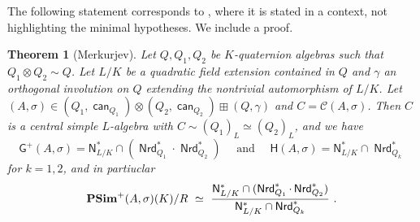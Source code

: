 \documentclass[twoside,11pt]{amsart}
\numberwithin{equation}{section}
\newtheorem{thm}[equation]{Theorem}
\theoremstyle{definition}
\newcommand\ind{\operatorname{\mathsf{ind}}}
\newcommand\Nrd{\operatorname{\mathsf{Nrd}}}
\newcommand\N{\operatorname{N}}
\newcommand{\can}{\operatorname{\mathsf{can}}}
\newcommand{\s}{\sigma}
\newcommand{\mc}{\mathcal}
\renewcommand{\N}{\mathsf{N}}
\newcommand{\G}{\mathsf{G}}
\renewcommand{\H}{\mathsf{H}}
\newcommand{\Cl}{\mc{C}}
\begin{document}
The following statement corresponds to \cite[Prop.~9]{Mer96}, where it is stated in a context, not highlighting the minimal hypotheses. 
We include a proof.

\begin{thm}[Merkurjev] 
\label{T:MerkProp9}
    Let $Q,Q_1,Q_2$ be $K$-quaternion  algebras such that $Q_1\otimes Q_2\sim Q$.
    Let $L/K$ be a quadratic field extension contained in $Q$ and $\gamma$ an orthogonal involution on $Q$ extending the nontrivial automorphism of $L/K$.
    Let $(A,\s)\in (Q_1,\can_{Q_1})\otimes (Q_2,\can_{Q_2})\boxplus (Q,\gamma)$ and $C=\Cl(A,\s)$.
    Then $C$ is a central simple $L$-algebra
with $C\sim (Q_1)_L\simeq (Q_2)_L$, and we have 
$$\G^+(A,\s)  = \N_{L/K}^\ast\cap(\Nrd_{Q_1}^\ast\cdot \Nrd_{Q_2}^\ast) \quad\mbox{ and }\quad
\H(A,\s) = \N^\ast_{L/K}\cap \Nrd^\ast_{Q_k}$$
for $k=1,2$, and in partiuclar
    $${\bf PSim}^+(A,\s)(K)/R\,\,\simeq \,\,\dfrac{\N_{L/K}^\ast\cap(\Nrd_{Q_1}^\ast\cdot \Nrd_{Q_2}^\ast)}{\N^\ast_{L/K}\cap \Nrd^\ast_{Q_k}}\,\,.$$
\end{thm}
\end{document}
